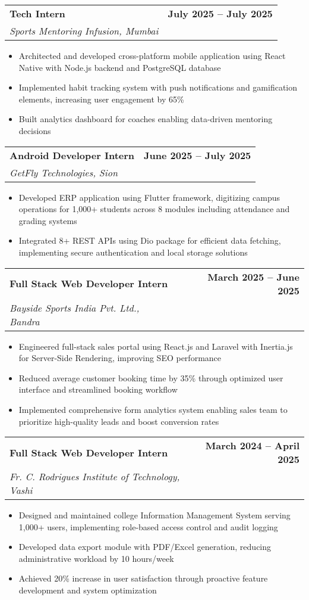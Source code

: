 \documentclass[10pt,a4paper]{article}
\makeatletter
\newcommand{\resumeItem}[1]{\item\small{#1}}
\newcommand{\resumeSubheading}[4]{
  \vspace{-1pt}
  \begin{tabular*}{\textwidth}[t]{l@{\extracolsep{\fill}}r}
    \textbf{#1} & \textcolor{light}{\small\textbf{#2}} \\
    \textit{\small#3} & \textcolor{light}{\small#4} \\
  \end{tabular*}\vspace{-5pt}
}
\makeatother
\begin{document}
\vspace{0.1em}

\resumeSubheading
{Tech Intern}{July 2025 -- July 2025}
{Sports Mentoring Infusion, Mumbai}{}
\begin{itemize}
    \resumeItem{Architected and developed cross-platform mobile application using React Native with Node.js backend and PostgreSQL database}
    \resumeItem{Implemented habit tracking system with push notifications and gamification elements, increasing user engagement by 65\%}
    \resumeItem{Built analytics dashboard for coaches enabling data-driven mentoring decisions}
\end{itemize}

\vspace{0.1em}

\resumeSubheading
{Android Developer Intern}{June 2025 -- July 2025}
{GetFly Technologies, Sion}{}
\begin{itemize}
    \resumeItem{Developed ERP application using Flutter framework, digitizing campus operations for 1,000+ students across 8 modules including attendance and grading systems}
    \resumeItem{Integrated 8+ REST APIs using Dio package for efficient data fetching, implementing secure authentication and local storage solutions}
\end{itemize}

\vspace{0.1em}

\resumeSubheading
{Full Stack Web Developer Intern}{March 2025 -- June 2025}
{Bayside Sports India Pvt. Ltd., Bandra}{}
\begin{itemize}
    \resumeItem{Engineered full-stack sales portal using React.js and Laravel with Inertia.js for Server-Side Rendering, improving SEO performance}
    \resumeItem{Reduced average customer booking time by 35\% through optimized user interface and streamlined booking workflow}
    \resumeItem{Implemented comprehensive form analytics system enabling sales team to prioritize high-quality leads and boost conversion rates}
\end{itemize}

\vspace{0.1em}

\resumeSubheading
{Full Stack Web Developer Intern}{March 2024 -- April 2025}
{Fr. C. Rodrigues Institute of Technology, Vashi}{}
\begin{itemize}
    \resumeItem{Designed and maintained college Information Management System serving 1,000+ users, implementing role-based access control and audit logging}
    \resumeItem{Developed data export module with PDF/Excel generation, reducing administrative workload by 10 hours/week}
    \resumeItem{Achieved 20\% increase in user satisfaction through proactive feature development and system optimization}
\end{itemize}
\end{document}
